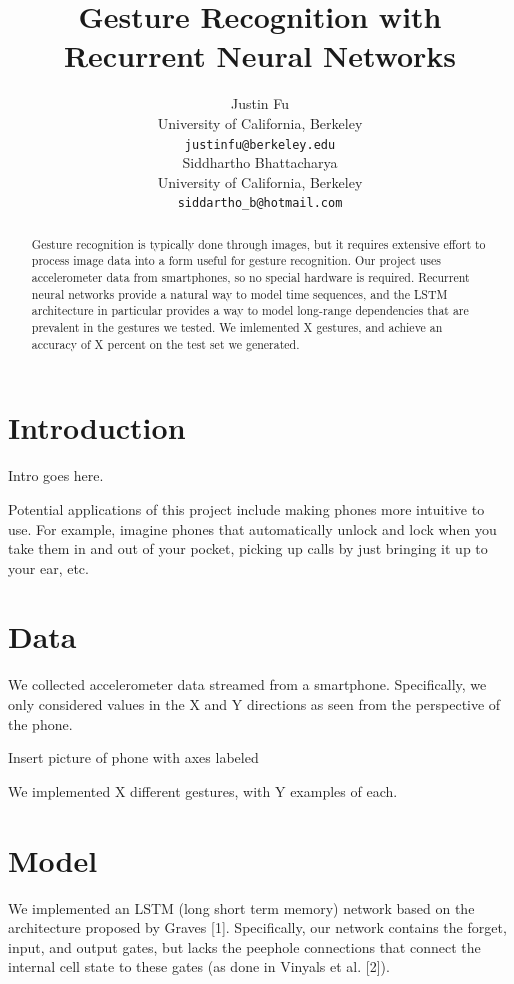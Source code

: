 \documentclass[11pt]{article}
\title{Gesture Recognition with Recurrent Neural Networks}
\author{Justin Fu \\
  University of California, Berkeley\\
  {\tt justinfu@berkeley.edu} \\\And
  Siddhartho Bhattacharya \\
  University of California, Berkeley\\
  {\tt siddartho\_b@hotmail.com} \\}
\date{}
\begin{document}
\maketitle 
\begin{abstract}
  Gesture recognition is typically done through images, but it requires
  extensive effort to process image data into a form useful for gesture
  recognition. Our project uses accelerometer data from smartphones,
  so no special hardware is required.
  Recurrent neural networks provide a natural way to model time
  sequences, and the LSTM architecture in particular provides a way
  to model long-range dependencies that are prevalent in
  the gestures we tested. We imlemented X gestures, and achieve an
  accuracy of X percent on the test set we generated.
\end{abstract}

\section{Introduction}

Intro goes here.

Potential applications of this project include making
phones more intuitive to use. For example, imagine 
phones that automatically unlock and lock when you take 
them in and out of your pocket, picking up calls by just
bringing it up to your ear, etc.

\section{Data}

We collected accelerometer data streamed from a smartphone.
Specifically, we only considered values in the X and Y directions
as seen from the perspective of the phone. 

Insert picture of phone with axes labeled

We implemented X different gestures, with Y examples of each.

\section{Model}
\label{sect:pdf}

We implemented an LSTM (long short term memory) network based on
the architecture proposed by Graves [1]. Specifically,
our network contains the forget, input, and output gates, but lacks the
peephole connections that connect the internal cell state to these gates
(as done in Vinyals et al. [2]).
\end{document}
